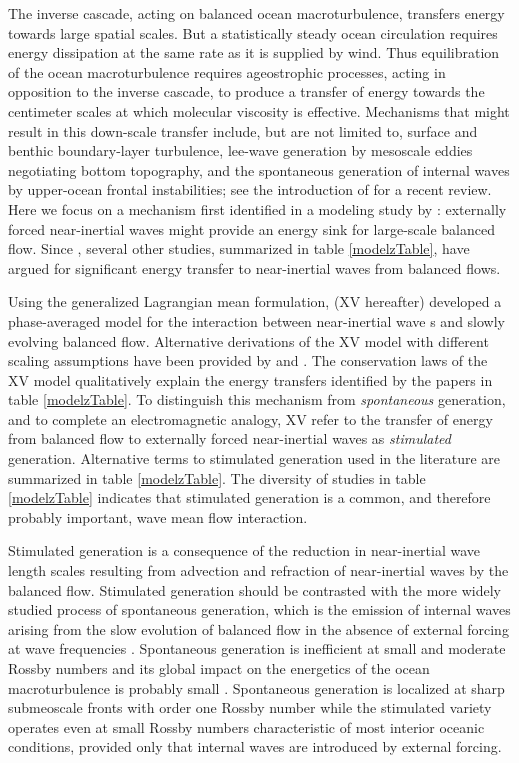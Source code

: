 \documentclass{jfm}
\newcommand{\NIW}{near-inertial wave}
\newcommand{\macrot}{macroturbulence}
\begin{document}
The  inverse cascade, acting on balanced ocean \macrot{},  transfers energy towards
large spatial scales. But a statistically steady ocean circulation requires
energy dissipation at the same rate as it is supplied  by wind.  Thus equilibration of
the  ocean \macrot{}  requires ageostrophic processes, acting in opposition to the
inverse cascade, to produce   a transfer of energy  towards the centimeter scales
at which molecular viscosity is effective.  Mechanisms that might result in this
down-scale transfer   include, but are not limited to, surface and
benthic boundary-layer turbulence, lee-wave generation by mesoscale eddies negotiating
bottom topography, and the spontaneous generation of internal waves by upper-ocean
frontal instabilities; see the introduction of \citet{nagai_etal2015} for a recent
review. Here we focus on a mechanism first identified  in a modeling study by
\cite{gertz_straub2009}:  externally forced \NIW s might provide an energy sink
for large-scale balanced flow. Since \cite{gertz_straub2009}, several other studies,
summarized in table \ref{modelzTable}, have argued for significant energy transfer
to \NIW s from balanced flows.

Using the generalized  Lagrangian mean formulation,  \citet{xie_vanneste2015}
(XV hereafter) developed a phase-averaged model for the interaction between \NIW
s and slowly evolving  balanced flow. Alternative derivations of the  XV model with  different
scaling assumptions  have been provided by \cite{salmon2016} and \cite{wagner_young2016}. The conservation laws of the XV model  qualitatively explain  the energy transfers identified by the papers in table \ref{modelzTable}. To distinguish this mechanism from \textit{spontaneous} generation, and to complete an electromagnetic analogy, XV refer to the transfer of energy from balanced flow to externally forced near-inertial waves  as  \textit{stimulated} generation.  Alternative terms to stimulated generation  used in the  literature are  summarized in  table \ref{modelzTable}.
The diversity of  studies in table \ref{modelzTable} indicates that stimulated
generation is a common, and therefore probably  important, wave mean flow interaction.

Stimulated generation is a consequence of the reduction in \NIW{} length scales
resulting from  advection and refraction of \NIW s by the balanced flow.
Stimulated generation should be contrasted with the more widely studied process
of spontaneous generation, which is the emission of internal waves arising
from the slow evolution of balanced flow in the absence  of external forcing at
wave frequencies \citep{vanneste2013}. Spontaneous generation is inefficient at
small and  moderate Rossby numbers and its global impact on the energetics of the
ocean \macrot{}   is probably small \citep{danioux_etal2012, nagai_etal2015}.
Spontaneous generation is localized at sharp submeoscale fronts with  order one
Rossby  number   \citep[e.g., ][]{shakespeare_hogg2017} while the stimulated variety  operates even at  small Rossby numbers characteristic of most interior oceanic conditions, provided only that internal waves are introduced by external forcing. 
\end{document}
